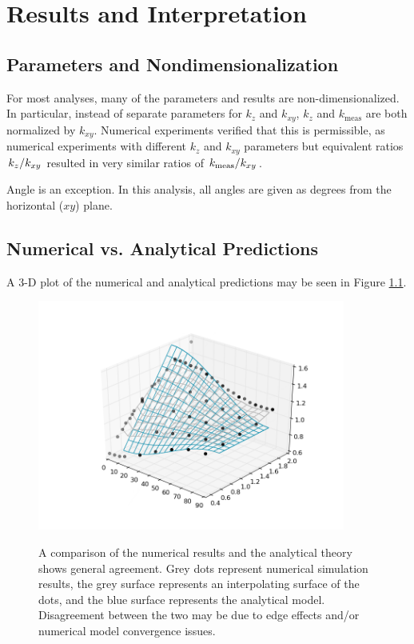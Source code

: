 \chapter{Results and Interpretation}

\section{Parameters and Nondimensionalization}

For most analyses, many of the parameters and results are non-dimensionalized. In
particular, instead of separate parameters for \(k_z\) and \(k_{xy}\), \(k_z\)
and \(k_{\textrm{meas}}\) are both normalized by \(k_{xy}\). Numerical
experiments verified that this is permissible, as numerical experiments with
different \(k_z\) and \(k_{xy}\) parameters but equivalent ratios
\(\left.{k_z}\middle/{k_{xy}}\right.\) resulted in very similar ratios of
\(\left.{k_{\textrm{meas}}}\middle/{k_{xy}}\right.\).

Angle is an exception. In this analysis, all angles are given as degrees from
the horizontal (\(xy\)) plane.

\section{Numerical vs. Analytical Predictions}

A 3-D plot of the numerical and analytical predictions may be seen in 
Figure \ref{fig:numvanal}.

\begin{figure}[h]
\centering
\includegraphics[width=0.9\textwidth]{fig/numvanal.png}
\label{fig:numvanal}
\caption{A comparison of the numerical results and the analytical theory shows
general agreement. Grey dots represent numerical simulation results, the grey surface represents an interpolating surface of the dots, and the blue surface represents the analytical model. Disagreement between the two may be due to edge effects and/or numerical
model convergence issues.}
\end{figure}

